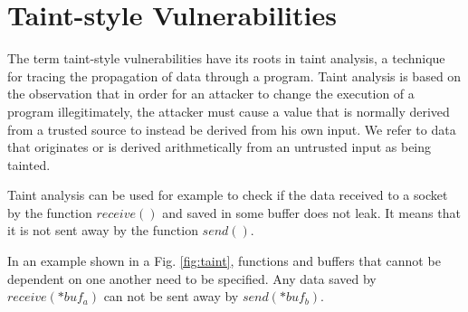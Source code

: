 \documentclass[a4paper, 12pt, journal, onecolumn]{IEEEtran}
\begin{document}





\section{Taint-style Vulnerabilities}


The term taint-style vulnerabilities have its roots in taint analysis, a technique for tracing the propagation of data through a program.\cite{a6} Taint analysis is based on the observation that in order for an attacker to change the execution of a program illegitimately, the attacker must cause a value that is normally derived from a trusted source to instead be derived from his own input. We refer to data that originates or is derived arithmetically from an untrusted input as being tainted. \cite{taint2}

Taint analysis can be used for example to check if the data received to a socket by the function $receive()$ and saved in some buffer does not leak. It means that it is not sent away by the function $send()$.

In an example shown in a Fig. \ref{fig:taint}, functions and buffers that cannot be dependent on one another need to be specified. Any data saved by $receive(*buf_a)$ can not be sent away by $send(*buf_b)$. 
\\
\end{document}
